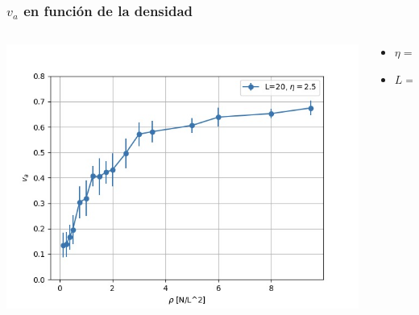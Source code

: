 \begin{frame}
\frametitle{\(v_a\) en función de la densidad}
\begin{columns}
    \begin{column}{0.6\textwidth}
      \begin{center}
        \includegraphics[width=\textwidth]{images/va-vs-density.jpeg} %
      \end{center}
    \end{column}
    \begin{column}{0.4\textwidth}
                \footnotesize
    \begin{center}
                \begin{itemize}
        \item \(\eta = 2.5\)
        \item \(  L = 20\)
        \end{itemize}
    \end{center}
    \end{column}
\end{columns}
\end{frame}
